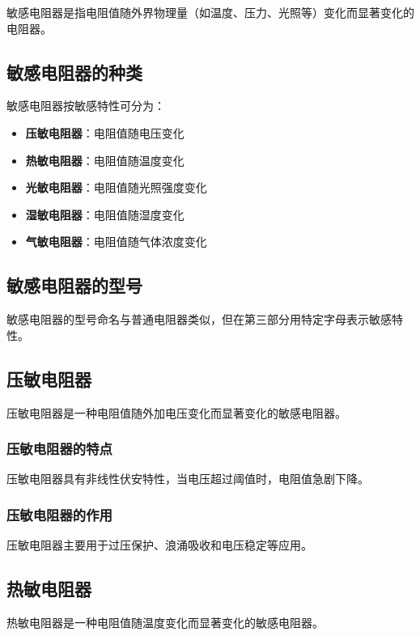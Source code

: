 \documentclass[12pt,UTF8]{ctexbook}
\begin{document}
敏感电阻器是指电阻值随外界物理量（如温度、压力、光照等）变化而显著变化的电阻器。

\subsection{敏感电阻器的种类}

敏感电阻器按敏感特性可分为：

\begin{itemize}[leftmargin=2cm]
	\item \textbf{压敏电阻器}：电阻值随电压变化
	\item \textbf{热敏电阻器}：电阻值随温度变化
	\item \textbf{光敏电阻器}：电阻值随光照强度变化
	\item \textbf{湿敏电阻器}：电阻值随湿度变化
	\item \textbf{气敏电阻器}：电阻值随气体浓度变化
\end{itemize}

\subsection{敏感电阻器的型号}

敏感电阻器的型号命名与普通电阻器类似，但在第三部分用特定字母表示敏感特性。

\subsection{压敏电阻器}

压敏电阻器是一种电阻值随外加电压变化而显著变化的敏感电阻器。

\subsubsection{压敏电阻器的特点}

压敏电阻器具有非线性伏安特性，当电压超过阈值时，电阻值急剧下降。

\subsubsection{压敏电阻器的作用}

压敏电阻器主要用于过压保护、浪涌吸收和电压稳定等应用。

\subsection{热敏电阻器}

热敏电阻器是一种电阻值随温度变化而显著变化的敏感电阻器。
\end{document}
